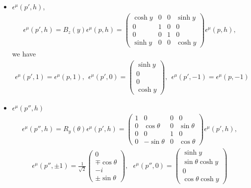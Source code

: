 \documentclass[11pt]{article}
\def\eps{\epsilon}
\begin{document}
\section{ }
\begin{itemize}
    \item  $\eps^\mu(p',h)$, 
    \begin{eqnarray}
    \eps^\mu(p',h) = B_z(y) \eps^\mu(p,h)=
        \begin{pmatrix}
            \cosh y & 0 & 0 & \sinh y \\
            0 & 1 & 0 & 0 \\
            0 & 0 & 1 & 0 \\
            \sinh y & 0 & 0 & \cosh y
        \end{pmatrix}
    \eps^\mu(p,h),
    \end{eqnarray}
    we have 
    \begin{eqnarray}
        \eps^\mu(p',1)
        =\eps^\mu(p,1),~~
        \eps^\mu(p',0)=
        \begin{pmatrix}
            \sinh y \\ 0 \\ 0 \\ \cosh y
        \end{pmatrix},~~
        \eps^\mu(p',-1)=\eps^\mu(p,-1)
    \end{eqnarray}
    \item $\eps^\mu(p{''},h)$
    \begin{eqnarray}
        \eps^\mu(p{''},h)  = R_y(\theta) \eps^\mu(p',h) =
        \begin{pmatrix}
            1 & 0 & 0 & 0 \\
            0 &\cos\theta & 0 &\sin\theta \\
            0 & 0 & 1 & 0\\
            0 &-\sin\theta & 0 & \cos\theta
        \end{pmatrix}
        \eps^\mu(p',h),
    \end{eqnarray}
    \begin{eqnarray}
        \eps^\mu(p{''},\pm1)=
        \frac{1}{\sqrt 2}
        \begin{pmatrix}
            0 \\ \mp \cos\theta \\ -i \\ \pm \sin\theta
        \end{pmatrix},~~~
        \eps^\mu(p{''},0)=
        \begin{pmatrix}
            \sinh y \\ \sin\theta\cosh y \\ 0 \\\cos\theta \cosh y

\end{pmatrix}
\end{eqnarray}
\end{itemize}
\end{document}
